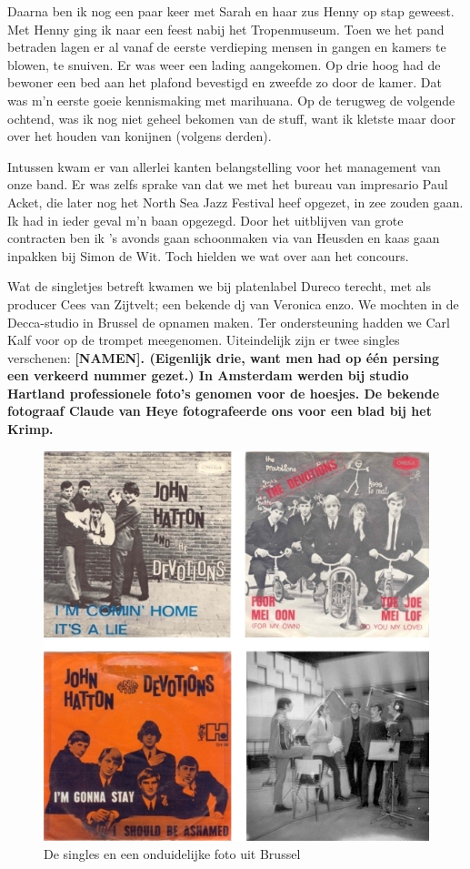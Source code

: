 \documentclass[12pt,twoside, openright]{memoir}
\begin{document}
Daarna ben ik nog een paar keer met Sarah en haar zus Henny op stap geweest. Met Henny ging ik naar een feest nabij het Tropenmuseum. Toen we het pand betraden lagen er al vanaf de eerste verdieping mensen in gangen en kamers te blowen, te snuiven. Er was weer een lading aangekomen. Op drie hoog had de bewoner een bed aan het plafond bevestigd en zweefde zo door de kamer. Dat was m’n eerste goeie kennismaking met marihuana. Op de terugweg de volgende ochtend, was ik nog niet geheel bekomen van de stuff, want ik kletste maar door over het houden van konijnen (volgens derden).

Intussen kwam er van allerlei kanten belangstelling voor het management van onze band. Er was zelfs sprake van dat we met het bureau van impresario Paul Acket, die later nog het North Sea Jazz Festival heef opgezet, in zee zouden gaan. Ik had in ieder geval m’n baan opgezegd. Door het uitblijven van grote contracten ben ik ’s avonds gaan schoonmaken via van Heusden en kaas gaan inpakken bij Simon de Wit. Toch hielden we wat over aan het concours.

Wat de singletjes betreft kwamen we bij platenlabel Dureco terecht, met als producer Cees van Zijtvelt; een bekende dj van Veronica enzo. We mochten in de Decca-studio in Brussel de opnamen maken. Ter ondersteuning hadden we Carl Kalf voor op de trompet meegenomen. Uiteindelijk zijn er twee singles verschenen: \bf{[NAMEN]}. (Eigenlijk drie, want men had op één persing een verkeerd nummer gezet.) In Amsterdam werden bij studio Hartland professionele foto’s genomen voor de hoesjes. De bekende fotograaf Claude van Heye fotografeerde ons voor een blad bij het Krimp.

\begin{figure}
\includegraphics[width=\textwidth]{img/ch27/4pieces}
\caption*{\footnotesize De singles en een onduidelijke foto uit Brussel}
\end{figure}
\end{document}
